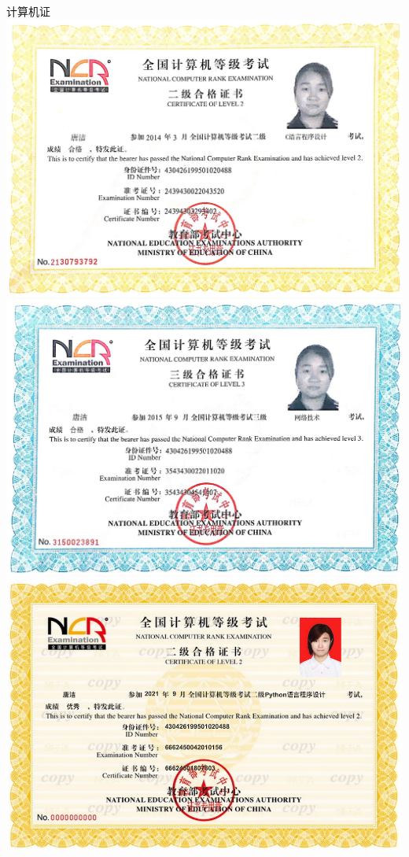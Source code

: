 \documentclass[UFT8]{ctexart}%
\begin{document}
\begin{center}
计算机证
  \includegraphics[scale=0.22]{figs/计算机二级C.JPG }
   \includegraphics[scale=0.22]{figs/计算机三级证书.JPG }
   \includegraphics[scale=0.45]{figs/计算机二级Python.JPG }
   

\end{center}
\end{document}
